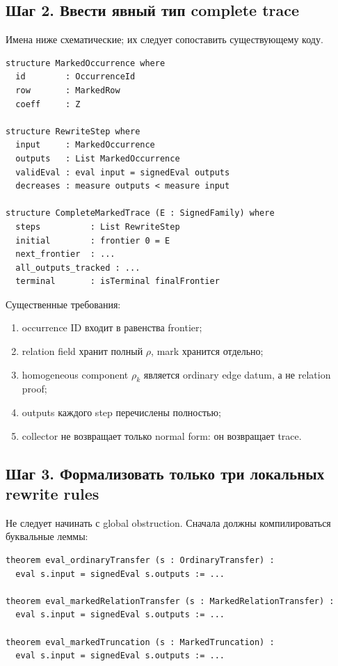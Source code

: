 \documentclass[11pt,a4paper]{article}
\theoremstyle{definition}
\theoremstyle{remark}
\begin{document}
\subsection{Шаг 2. Ввести явный тип complete trace}

Имена ниже схематические; их следует сопоставить существующему коду.

\begin{lstlisting}
structure MarkedOccurrence where
  id        : OccurrenceId
  row       : MarkedRow
  coeff     : Z

structure RewriteStep where
  input     : MarkedOccurrence
  outputs   : List MarkedOccurrence
  validEval : eval input = signedEval outputs
  decreases : measure outputs < measure input

structure CompleteMarkedTrace (E : SignedFamily) where
  steps          : List RewriteStep
  initial        : frontier 0 = E
  next_frontier  : ...
  all_outputs_tracked : ...
  terminal       : isTerminal finalFrontier
\end{lstlisting}

Существенные требования:
\begin{enumerate}
\item occurrence ID входит в равенства frontier;
\item relation field хранит полный $\rho$, mark хранится отдельно;
\item homogeneous component $\rho_k$ является ordinary edge datum, а не
relation proof;
\item outputs каждого step перечислены полностью;
\item collector не возвращает только normal form: он возвращает trace.
\end{enumerate}

\subsection{Шаг 3. Формализовать только три локальных rewrite rules}

Не следует начинать с global obstruction. Сначала должны компилироваться
буквальные леммы:

\begin{lstlisting}
theorem eval_ordinaryTransfer (s : OrdinaryTransfer) :
  eval s.input = signedEval s.outputs := ...

theorem eval_markedRelationTransfer (s : MarkedRelationTransfer) :
  eval s.input = signedEval s.outputs := ...

theorem eval_markedTruncation (s : MarkedTruncation) :
  eval s.input = signedEval s.outputs := ...
\end{lstlisting}
\end{document}
